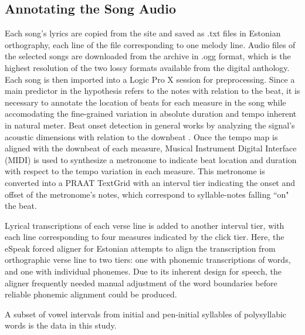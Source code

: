 \subsection{Annotating the Song Audio }

 Each song's lyrics are copied from the site and saved as .txt files in Estonian orthography, each line of the file corresponding to one melody line.  
Audio files of the selected songs are downloaded from the archive in .ogg format, which is the highest resolution of the two lossy formats available from the digital anthology. Each song is then imported into a Logic Pro X \citep{logic2014} session for preprocessing. 
Since a main predictor in the hypothesis refers to the notes with relation to the beat, it is necessary to annotate the location of beats for each measure in the song while accomodating the fine-grained variation in absolute duration and tempo inherent in natural meter. 
Beat onset detection in general works by analyzing the signal's acoustic dimensions with relation to the downbeat \citep{bKeeper2007}. 
Once the tempo map is aligned with the downbeat of each measure, Musical Instrument Digital Interface (MIDI) is used to synthesize a metronome to indicate beat location and duration with respect to the tempo variation in each measure. This metronome is converted into a PRAAT\citep{boersna2022} TextGrid with an interval tier indicating the onset and offset of the metronome's notes, which correspond to syllable-notes falling ``on" the beat. 


 
Lyrical transcriptions of each verse line is added to another interval tier, with each line corresponding to four measures indicated by the click tier.  Here, the eSpeak forced aligner for Estonian \citep{eSpeak1995} attempts to align the transcription from orthographic verse line to two tiers: one with phonemic transcriptions of words, and one with individual phonemes. Due to its inherent design for speech, the aligner frequently needed manual adjustment of the word boundaries before reliable phonemic alignment could be produced. 

A subset of vowel intervals from initial and pen-initial syllables of polysyllabic words is the data in this study. 



